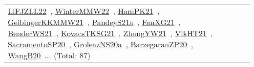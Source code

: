 {\begin{longtable}{lp{3cm}>{\raggedright\arraybackslash}p{6cm}>{\raggedright\arraybackslash}p{6cm}>{\raggedright\arraybackslash}p{8cm}}
\href{papers/LiFJZLL22.pdf}{LiFJZLL22}~\cite{LiFJZLL22}, \href{papers/WinterMMW22.pdf}{WinterMMW22}~\cite{WinterMMW22}, \href{articles/HamPK21.pdf}{HamPK21}~\cite{HamPK21}, \href{papers/GeibingerKKMMW21.pdf}{GeibingerKKMMW21}~\cite{GeibingerKKMMW21}, \href{articles/PandeyS21a.pdf}{PandeyS21a}~\cite{PandeyS21a}, \href{articles/FanXG21.pdf}{FanXG21}~\cite{FanXG21}, \href{papers/BenderWS21.pdf}{BenderWS21}~\cite{BenderWS21}, \href{papers/KovacsTKSG21.pdf}{KovacsTKSG21}~\cite{KovacsTKSG21}, \href{articles/ZhangYW21.pdf}{ZhangYW21}~\cite{ZhangYW21}, \href{articles/VlkHT21.pdf}{VlkHT21}~\cite{VlkHT21}, \href{articles/SacramentoSP20.pdf}{SacramentoSP20}~\cite{SacramentoSP20}, \href{papers/GroleazNS20a.pdf}{GroleazNS20a}~\cite{GroleazNS20a}, \href{papers/BarzegaranZP20.pdf}{BarzegaranZP20}~\cite{BarzegaranZP20}, \href{papers/WangB20.pdf}{WangB20}~\cite{WangB20}... (Total: 87)\\

\end{longtable}}
